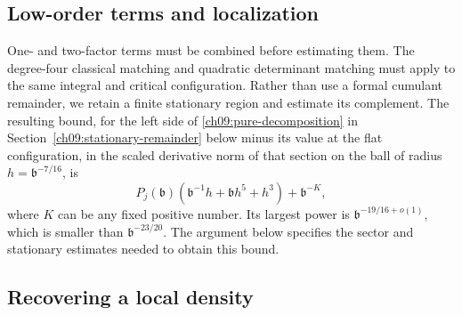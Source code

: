 \subsection{Low-order terms and localization}

One- and two-factor terms must be combined before estimating them.
The degree-four classical matching and quadratic determinant matching
must apply to the same integral and critical configuration. Rather than
use a formal cumulant remainder, we retain a finite stationary
region and estimate its complement. The resulting bound, for the left side of \eqref{ch09:pure-decomposition} in Section~\ref{ch09:stationary-remainder} below minus its value at the flat configuration, in the scaled derivative norm of that section on the ball of radius $h=\mathfrak b^{-7/16}$, is
\begin{equation}
 P_j(\mathfrak b)\left(
 \mathfrak b^{-1}h+\mathfrak b h^5+h^3\right)
                         +\mathfrak b^{-K},
 \label{ch09:aux-input}
\end{equation}
where $K$ can be any fixed positive number. Its largest power is
$\mathfrak b^{-19/16+o(1)}$, which is smaller than
$\mathfrak b^{-23/20}$. The argument below specifies the
sector and stationary estimates needed to obtain this bound.



\subsection{Recovering a local density}
\label{ch09:local-density}

